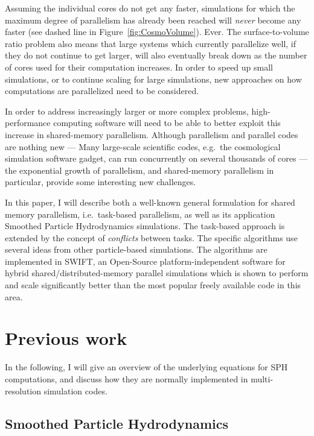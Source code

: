 \documentclass[final]{siamltex}
\newcommand{\fig}[1]
    {Figure~\ref{fig:#1}}
\begin{document}
Assuming the individual cores do not get any faster,
simulations for which the
maximum degree of parallelism has already been reached will
{\em never} become any faster (see dashed line in \fig{CosmoVolume}).
Ever.
The surface-to-volume ratio problem also means that large
systems which currently parallelize well, if they do not continue
to get larger, will also eventually break down as the number
of cores used for their computation increases.
In order to speed up small simulations, or to continue
scaling for large simulations, new approaches on how
computations are parallelized need to be considered.

In order to address increasingly larger
or more complex problems, high-performance computing software
will need to be able to better exploit this increase in shared-memory
parallelism.
Although parallelism and parallel codes are nothing new ---
Many large-scale scientific codes, e.g.~the cosmological
simulation software {\sc gadget}, can run concurrently
on several thousands of cores ---
the exponential growth of parallelism, and shared-memory
parallelism in particular, provide some interesting 
new challenges.

In this paper, I will describe both a well-known general formulation
for shared memory parallelism, i.e.~task-based parallelism, as well
as its application Smoothed Particle Hydrodynamics simulations.
The task-based approach is extended by the concept of {\em conflicts}
between tasks.
The specific algorithms use several ideas from other particle-based
simulations.
The algorithms are implemented in SWIFT, an Open-Source
platform-independent software for hybrid shared/distributed-memory
parallel simulations which is shown to perform and scale
significantly better than the most popular freely available code
in this area.


\section{Previous work}

In the following, I will give an overview of the underlying equations for
SPH computations, and discuss how they are normally implemented
in multi-resolution simulation codes.


\subsection{Smoothed Particle Hydrodynamics}
\end{document}
